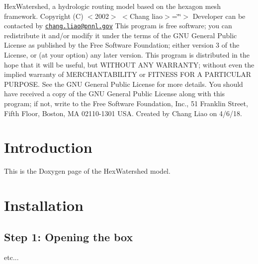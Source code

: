 Hex\-Watershed, a hydrologic routing model based on the hexagon mesh framework. Copyright (C) $<$2002$>$ $<$\-Chang liao$>$=\char`\"{}\char`\"{}$>$ Developer can be contacted by \href{mailto:chang.liao@pnnl.gov}{\tt chang.\-liao@pnnl.\-gov} This program is free software; you can redistribute it and/or modify it under the terms of the G\-N\-U General Public License as published by the Free Software Foundation; either version 3 of the License, or (at your option) any later version. This program is distributed in the hope that it will be useful, but W\-I\-T\-H\-O\-U\-T A\-N\-Y W\-A\-R\-R\-A\-N\-T\-Y; without even the implied warranty of M\-E\-R\-C\-H\-A\-N\-T\-A\-B\-I\-L\-I\-T\-Y or F\-I\-T\-N\-E\-S\-S F\-O\-R A P\-A\-R\-T\-I\-C\-U\-L\-A\-R P\-U\-R\-P\-O\-S\-E. See the G\-N\-U General Public License for more details. You should have received a copy of the G\-N\-U General Public License along with this program; if not, write to the Free Software Foundation, Inc., 51 Franklin Street, Fifth Floor, Boston, M\-A 02110-\/1301 U\-S\-A. Created by Chang Liao on 4/6/18.\hypertarget{index_intro_sec}{}\section{Introduction}\label{index_intro_sec}
This is the Doxygen page of the Hex\-Watershed model.\hypertarget{index_install_sec}{}\section{Installation}\label{index_install_sec}
\hypertarget{index_step1}{}\subsection{Step 1\-: Opening the box}\label{index_step1}
etc... 